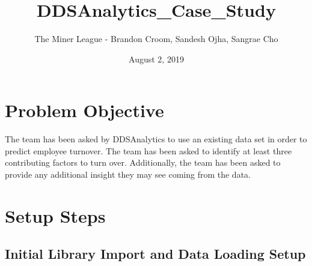 \documentclass[]{article}
\title{DDSAnalytics\_Case\_Study}
\author{The Miner League - Brandon Croom, Sandesh Ojha, Sangrae Cho}
\date{August 2, 2019}
\begin{document}
\maketitle

\section{Problem Objective}\label{problem-objective}

The team has been asked by DDSAnalytics to use an existing data set in
order to predict employee turnover. The team has been asked to identify
at least three contributing factors to turn over. Additionally, the team
has been asked to provide any additional insight they may see coming
from the data.

\section{Setup Steps}\label{setup-steps}

\subsection{Initial Library Import and Data Loading
Setup}\label{initial-library-import-and-data-loading-setup}
\end{document}
